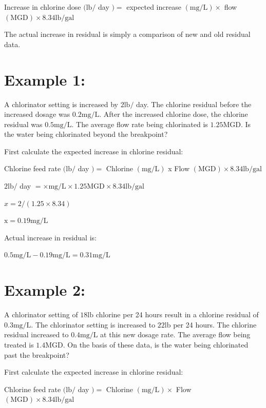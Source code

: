 \documentclass[10pt]{article}
\begin{document}
Increase in chlorine dose $(\mathrm{lb} /$ day $)=$ expected increase $(\mathrm{mg} / \mathrm{L}) \times$ flow $(\mathrm{MGD}) \times 8.34 \mathrm{lb} / \mathrm{gal}$

The actual increase in residual is simply a comparison of new and old residual data.

\section{Example 1:}
A chlorinator setting is increased by $2 \mathrm{lb} /$ day. The chlorine residual before the increased dosage was $0.2 \mathrm{mg} / \mathrm{L}$. After the increased chlorine dose, the chlorine residual was $0.5 \mathrm{mg} / \mathrm{L}$. The average flow rate being chlorinated is $1.25 \mathrm{MGD}$. Is the water being chlorinated beyond the breakpoint?

First calculate the expected increase in chlorine residual:

Chlorine feed rate $(\mathrm{lb} /$ day $)=$ Chlorine $(\mathrm{mg} / \mathrm{L})$ x Flow $(\mathrm{MGD}) \times 8.34 \mathrm{lb} / \mathrm{gal}$

$2 \mathrm{lb} /$ day $=\times \mathrm{mg} / \mathrm{L} \times 1.25 \mathrm{MGD} \times 8.34 \mathrm{lb} / \mathrm{gal}$

$x=2 /(1.25 \times 8.34)$

$\mathrm{x}=0.19 \mathrm{mg} / \mathrm{L}$

Actual increase in residual is:

$0.5 \mathrm{mg} / \mathrm{L}-0.19 \mathrm{mg} / \mathrm{L}=0.31 \mathrm{mg} / \mathrm{L}$

\section{Example 2:}
A chlorinator setting of $18 \mathrm{lb}$ chlorine per 24 hours result in a chlorine residual of $0.3 \mathrm{mg} / \mathrm{L}$. The chlorinator setting is increased to $22 \mathrm{lb}$ per 24 hours. The chlorine residual increased to $0.4 \mathrm{mg} / \mathrm{L}$ at this new dosage rate. The average flow being treated is $1.4 \mathrm{MGD}$. On the basis of these data, is the water being chlorinated past the breakpoint?

First calculate the expected increase in chlorine residual:

Chlorine feed rate $(\mathrm{lb} /$ day $)=$ Chlorine $(\mathrm{mg} / \mathrm{L}) \times$ Flow $(\mathrm{MGD}) \times 8.34 \mathrm{lb} / \mathrm{gal}$
\end{document}
